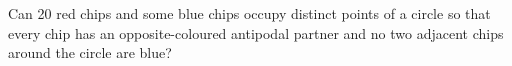 Can 20 red chips and some blue chips occupy distinct points of a circle so that every chip has an opposite-coloured antipodal partner and no two adjacent chips around the circle are blue?
